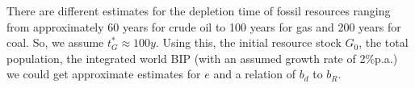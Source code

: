 There are different estimates for the depletion time of fossil resources ranging from approximately 60 years for crude oil to 100 years for gas and 200 years for coal.
So, we assume $t^*_G \approx 100y$. Using this, the initial resource stock $G_0$, the total population, the integrated world BIP (with an assumed growth rate of 2\%p.a.) we could get approximate estimates for $e$ and a relation of $b_d$ to  $b_R$.

\newpage 

